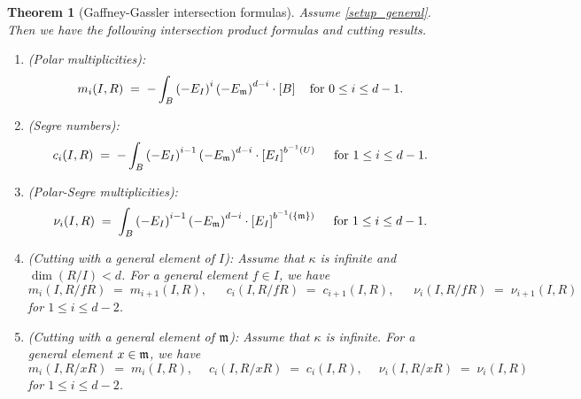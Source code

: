 \documentclass[a4paper, 11pt]{amsart}
\newcommand{\mm}{{\normalfont\mathfrak{m}}}
\newtheorem{theorem}{Theorem}[section]
\theoremstyle{definition}
\begin{document}
	\begin{theorem}[Gaffney-Gassler intersection formulas]
		\label{thm:main}
		Assume \autoref{setup_general}.
		Then we have the following intersection product formulas and cutting results.
		\begin{enumerate}[\rm (i)]
			\item {\rm(Polar multiplicities):}
			$$
			m_i(I,R)
			\;=\;
			-\int_B \left(-E_I\right)^i \left(-E_\mm\right)^{d-i} \cdot \left[B\right]
			\quad \text{for $0\le i\le d-1$}.
			$$
			\item {\rm(Segre numbers):}
			$$
			c_i(I,R)
			\;=\;
			-\int_B \left(-E_I\right)^{i-1} \left(-E_\mm\right)^{d-i} \cdot \left[E_I\right]^{b^{-1}(U)} 
			\quad \text{ for $1\le i\le d-1$}.
			$$
			\item {\rm(Polar-Segre multiplicities):}
			$$
			\nu_i(I,R)
			\;=\;
			\int_B \left(-E_I\right)^{i-1} \left(-E_\mm\right)^{d-i} \cdot \left[E_I\right]^{b^{-1}(\{\mm\})} 
			\quad \text{ for $1\le i\le d-1$}.
			$$
			\item {\rm(Cutting with a general element of $I$):}
			Assume that $\kappa$ is infinite and $\dim(R/I)<d$.
			For a general element $f\in I$, we have
			$$
			m_i(I,R/fR) \;=\; m_{i+1}(I,R), \quad\;\;
			c_i(I,R/fR) \;=\; c_{i+1}(I,R), \quad\;\;
			\nu_i(I,R/fR) \;=\; \nu_{i+1}(I,R)
			$$
			for $1\leq i\leq d-2$.
			\item {\rm(Cutting with a general element of $\mm$):}
			Assume that $\kappa$ is infinite.
			For a general element $x\in\mm$, we have
			$$
			m_i(I,R/xR) \;=\; m_{i}(I,R), \quad\; c_i(I,R/xR) \;=\; c_{i}(I,R), \quad\; \nu_i(I,R/xR) \;=\; \nu_{i}(I,R)
			$$
			for $1 \le i \le d-2$.
		\end{enumerate}
	\end{theorem}
	
\end{document}
